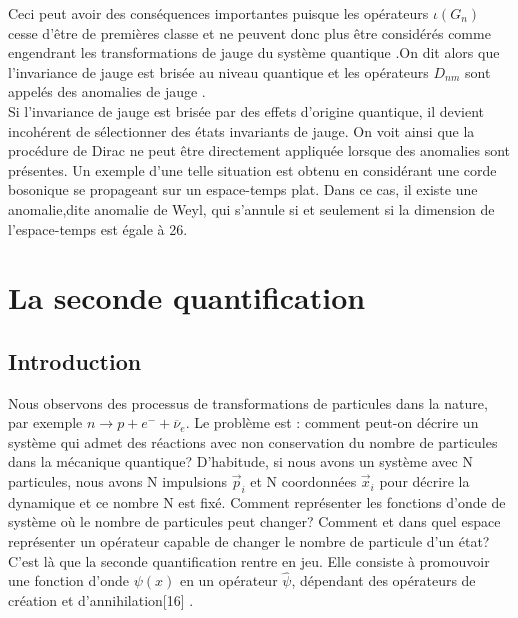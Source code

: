 \documentclass[12pt,a4paper, openany]{report}
\begin{document}
Ceci peut avoir des conséquences importantes puisque les opérateurs $\iota(G_n) $ cesse d'\^{e}tre de premières classe et ne peuvent donc plus \^{e}tre considérés comme engendrant les transformations de jauge du système quantique .On dit alors que l'invariance de jauge est brisée au niveau quantique et les opérateurs $D_{nm} $ sont appelés des anomalies de jauge . \\
Si l’invariance de jauge est brisée par des effets d’origine quantique, il devient incohérent de sélectionner des états invariants de jauge. On voit ainsi que la procédure de Dirac ne peut être directement appliquée lorsque des anomalies sont présentes. Un exemple d’une telle situation est obtenu en considérant une corde bosonique se propageant sur un espace-temps plat. Dans ce cas, il existe une anomalie,dite anomalie de Weyl, qui s’annule si et seulement si la dimension de l’espace-temps est égale à 26.

\section{La seconde quantification}
\subsection{Introduction}
Nous observons des processus de transformations de particules dans la nature, par exemple $n\rightarrow{p+e^{-}+\overline{\nu}_e}$. Le problème est : comment peut-on décrire un système qui admet des réactions avec non conservation du nombre de particules dans la mécanique quantique? D’habitude, si nous avons un système avec N particules, nous avons N impulsions $\vec{p}_i $ et N coordonnées $\vec{x}_i $ pour décrire la dynamique et ce nombre N est fixé. Comment représenter les fonctions d’onde de système où le nombre de particules peut changer? Comment et dans quel espace représenter un opérateur capable de changer le nombre de particule d’un état? C’est là que la seconde quantiﬁcation rentre en jeu. Elle consiste à promouvoir une fonction d’onde $\psi(x) $ en un opérateur $\hat{\psi} $, dépendant des opérateurs de création et d’annihilation[16] .
\end{document}
